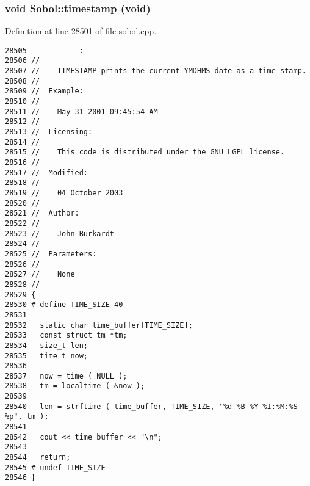 \subsubsection{\setlength{\rightskip}{0pt plus 5cm}void Sobol::timestamp (void)}\label{namespaceSobol_cdcb4cbc7988fd26d62d4c5cadb9de5f}




Definition at line 28501 of file sobol.cpp.

\begin{Code}\begin{verbatim}28505            :
28506 //
28507 //    TIMESTAMP prints the current YMDHMS date as a time stamp.
28508 //
28509 //  Example:
28510 //
28511 //    May 31 2001 09:45:54 AM
28512 //
28513 //  Licensing:
28514 //
28515 //    This code is distributed under the GNU LGPL license. 
28516 //
28517 //  Modified:
28518 //
28519 //    04 October 2003
28520 //
28521 //  Author:
28522 //
28523 //    John Burkardt
28524 //
28525 //  Parameters:
28526 //
28527 //    None
28528 //
28529 {
28530 # define TIME_SIZE 40
28531 
28532   static char time_buffer[TIME_SIZE];
28533   const struct tm *tm;
28534   size_t len;
28535   time_t now;
28536 
28537   now = time ( NULL );
28538   tm = localtime ( &now );
28539 
28540   len = strftime ( time_buffer, TIME_SIZE, "%d %B %Y %I:%M:%S %p", tm );
28541 
28542   cout << time_buffer << "\n";
28543 
28544   return;
28545 # undef TIME_SIZE
28546 }

\end{verbatim}
\end{Code}


